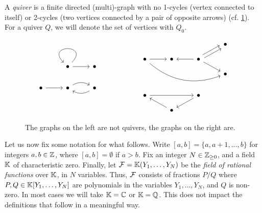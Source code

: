 \begin{definition}[Quivers]

	A \emph{quiver} is a finite directed (multi)-graph with no 1-cycles
	(vertex connected to itself) or 2-cycles (two vertices connected by a pair of opposite
	arrows) (cf. \cref{fig:quivers}). For a quiver $Q$, we will denote the set of vertices
	with $Q_0$.
\end{definition}

\begin{figure}[ht!]
	\centering
	\begin{equation*}
		\begin{tikzcd}
			&\bullet \arrow[loop] \arrow[r] &\bullet \\
			\bullet \rar & \bullet \arrow[r, bend left] & \bullet \arrow[l, bend left]
		\end{tikzcd}
		\hspace{2cm}
		\begin{tikzcd}[row sep=small]
			&&& \bullet \\
			\bullet \ar[rrrd, bend right]\rar &\bullet  \rar[leftarrow] &\bullet \ar[ru, shift left] \ar[ru, shift right] \ar[rd] \\
			&&& \bullet\\
			\\
			\bullet \ar[rr] && \bullet \ar[ld]\\
			& \bullet \ar[lu]
		\end{tikzcd}
	\end{equation*}
	\caption{The graphs on the left are not quivers, the graphs on the right are.}
	\label{fig:quivers}
\end{figure}

Let us now fix some notation for what follows. Write $[a,b] = \{a, a + 1, \dots, b\}$
for integers $a,b \in \mathbb{Z}$, where $[a,b] = \emptyset$ if $a > b$. Fix an integer $N
	\in \mathbb{Z}_{\geq 0}$, and a field $\mathbb{K}$ of characteristic zero. Finally, let $\mathcal{F} =
	\mathbb{K} (Y_1, \dots, Y_N)$ be the \emph{field of rational functions} over $\mathbb{K}$, in $N$ variables. Thus, $\mathcal{F}$ consists of fractions $P/Q$
where $P, Q\in \mathbb{K}[Y_1, \dots, Y_N]$ are polynomials in the variables $Y_1, \dots,
	Y_N$, and $Q$ is non-zero. In most cases we will take $\mathbb{K} = \mathbb{C}$ or $\mathbb{K} = \mathbb{Q}$.
This does not impact the definitions that follow in a meaningful way.

